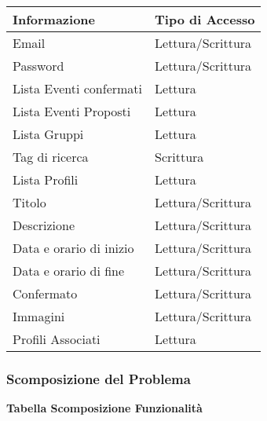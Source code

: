 \begin{tabular} {|P{7.8cm}|P{7.5cm}|}
    \hline
    \textbf{Informazione}   & \textbf{Tipo di Accesso} \\
    \hline
    Email                   & Lettura/Scrittura        \\
    \hline
    Password                & Lettura/Scrittura        \\
    \hline
    Lista Eventi confermati & Lettura                  \\
    \hline
    Lista Eventi Proposti   & Lettura                  \\
    \hline
    Lista Gruppi            & Lettura                  \\
    \hline
    Tag di ricerca          & Scrittura                \\
    \hline
    Lista Profili           & Lettura                  \\
    \hline
    Titolo                  & Lettura/Scrittura        \\
    \hline
    Descrizione             & Lettura/Scrittura        \\
    \hline
    Data e orario di inizio & Lettura/Scrittura        \\
    \hline
    Data e orario di fine   & Lettura/Scrittura        \\
    \hline
    Confermato              & Lettura/Scrittura        \\
    \hline
    Immagini                & Lettura/Scrittura        \\
    \hline
    Profili Associati       & Lettura                  \\
    \hline
\end{tabular}
\newpage

\subsubsection{Scomposizione del Problema}
\hfill \break

\textbf{Tabella Scomposizione Funzionalità}
\hfill \break


